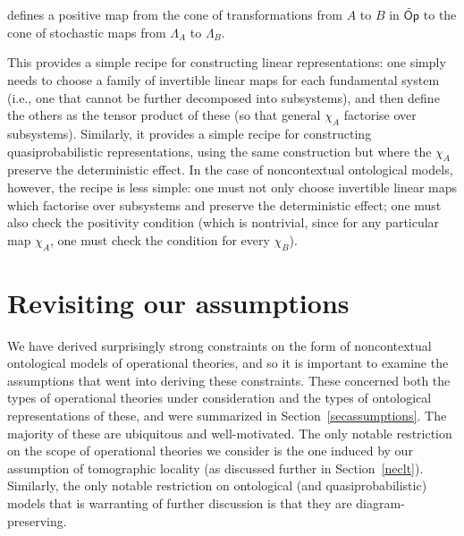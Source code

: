 \documentclass[onecolum,aps,groupedaddress,nofootinbib]{revtex4-2}
\newcommand\Op{\mathsf{Op}}
\begin{document}
\quad  \mapsto \quad{}
\eeq
defines a positive map from the cone of transformations from $A$ to $B$ in $\widetilde{\Op}$ to the cone of stochastic maps from $\Lambda_A$ to $\Lambda_B$.

This provides a simple recipe for constructing linear representations: one simply needs to choose a family of invertible linear maps for each fundamental system (i.e., one that cannot be further decomposed into subsystems),
 and then define the others as the tensor product of these (so that general $\chi_A$ factorise over subsystems). Similarly, it provides a simple recipe for constructing quasiprobabilistic representations, using the same construction but where the $\chi_A$ preserve the deterministic effect. In the case of noncontextual ontological models, however, the recipe is less simple: one must not only choose invertible linear maps which  factorise over subsystems and preserve the deterministic effect; one must also check the positivity condition (which is nontrivial, since for any particular map $\chi_A$, one must check the condition for every $\chi_B$).

\section{Revisiting our assumptions} \label{revisassump}

We have derived surprisingly strong constraints on the form of noncontextual ontological models of operational theories,
and so it is important to examine the assumptions that went into deriving these constraints.
These concerned both the types of operational theories under consideration and the types of ontological representations of these,
and were summarized in Section~\ref{secassumptions}. The majority of these are ubiquitous and well-motivated.
The only notable restriction on the scope of operational theories we consider is the one induced by our  assumption of tomographic locality  (as discussed further in Section~\ref{neclt}).
Similarly, the only notable restriction
on ontological (and quasiprobabilistic) models that is warranting of further discussion is that they are diagram-preserving.
\end{document}
